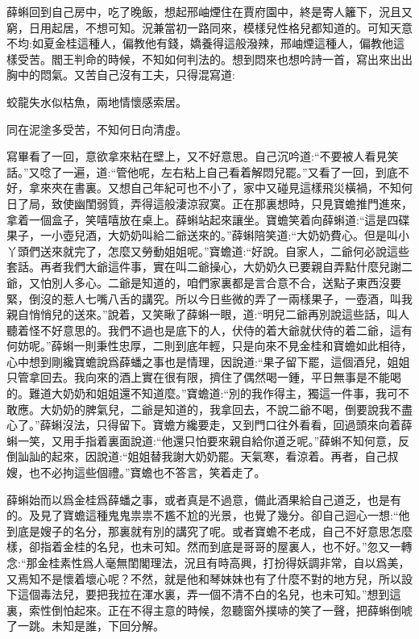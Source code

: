 \begin{parag}
    薛蝌回到自己房中，吃了晚飯，想起邢岫煙住在賈府園中，終是寄人籬下，況且又窮，日用起居，不想可知。況兼當初一路同來，模樣兒性格兒都知道的。可知天意不均:如夏金桂這種人，偏教他有錢，嬌養得這般潑辣，邢岫煙這種人，偏教他這樣受苦。閻王判命的時候，不知如何判法的。想到悶來也想吟詩一首，寫出來出出胸中的悶氣。又苦自己沒有工夫，只得混寫道:
\end{parag}


\begin{poem}
    \begin{pl}
        蛟龍失水似枯魚，兩地情懷感索居。
    \end{pl}


    \begin{pl}
        同在泥塗多受苦，不知何日向清虛。
    \end{pl}
\end{poem}


\begin{parag}
    寫畢看了一回，意欲拿來粘在壁上，又不好意思。自己沉吟道:“不要被人看見笑話。”又唸了一遍，道:“管他呢，左右粘上自己看着解悶兒罷。”又看了一回，到底不好，拿來夾在書裏。又想自己年紀可也不小了，家中又碰見這樣飛災橫禍，不知何日了局，致使幽閨弱質，弄得這般淒涼寂寞。正在那裏想時，只見寶蟾推門進來，拿着一個盒子，笑嘻嘻放在桌上。薛蝌站起來讓坐。寶蟾笑着向薛蝌道:“這是四碟果子，一小壺兒酒，大奶奶叫給二爺送來的。”薛蝌陪笑道:“大奶奶費心。但是叫小丫頭們送來就完了，怎麼又勞動姐姐呢。”寶蟾道:“好說。自家人，二爺何必說這些套話。再者我們大爺這件事，實在叫二爺操心，大奶奶久已要親自弄點什麼兒謝二爺，又怕別人多心。二爺是知道的，咱們家裏都是言合意不合，送點子東西沒要緊，倒沒的惹人七嘴八舌的講究。所以今日些微的弄了一兩樣果子，一壺酒，叫我親自悄悄兒的送來。”說着，又笑瞅了薛蝌一眼，道:“明兒二爺再別說這些話，叫人聽着怪不好意思的。我們不過也是底下的人，伏侍的着大爺就伏侍的着二爺，這有何妨呢。”薛蝌一則秉性忠厚，二則到底年輕，只是向來不見金桂和寶蟾如此相待，心中想到剛纔寶蟾說爲薛蟠之事也是情理，因說道:“果子留下罷，這個酒兒，姐姐只管拿回去。我向來的酒上實在很有限，擠住了偶然喝一鍾，平日無事是不能喝的。難道大奶奶和姐姐還不知道麼。”寶蟾道:“別的我作得主，獨這一件事，我可不敢應。大奶奶的脾氣兒，二爺是知道的，我拿回去，不說二爺不喝，倒要說我不盡心了。”薛蝌沒法，只得留下。寶蟾方纔要走，又到門口往外看看，回過頭來向着薛蝌一笑，又用手指着裏面說道:“他還只怕要來親自給你道乏呢。”薛蝌不知何意，反倒訕訕的起來，因說道:“姐姐替我謝大奶奶罷。天氣寒，看涼着。再者，自己叔嫂，也不必拘這些個禮。”寶蟾也不答言，笑着走了。
\end{parag}


\begin{parag}
    薛蝌始而以爲金桂爲薛蟠之事，或者真是不過意，備此酒果給自己道乏，也是有的。及見了寶蟾這種鬼鬼祟祟不尷不尬的光景，也覺了幾分。卻自己迴心一想:“他到底是嫂子的名分，那裏就有別的講究了呢。或者寶蟾不老成，自己不好意思怎麼樣，卻指着金桂的名兒，也未可知。然而到底是哥哥的屋裏人，也不好。”忽又一轉念:“那金桂素性爲人毫無閨閣理法，況且有時高興，打扮得妖調非常，自以爲美，又焉知不是懷着壞心呢？不然，就是他和琴妹妹也有了什麼不對的地方兒，所以設下這個毒法兒，要把我拉在渾水裏，弄一個不清不白的名兒，也未可知。”想到這裏，索性倒怕起來。正在不得主意的時候，忽聽窗外撲哧的笑了一聲，把薛蝌倒唬了一跳。未知是誰，下回分解。
\end{parag}